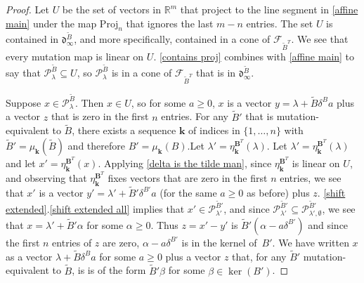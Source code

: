 \documentclass{amsart}
\theoremstyle{definition}
\theoremstyle{remark}
\numberwithin{equation}{section}
\newcommand{\reals}{\mathbb R}
\newcommand{\set}[1]{{\lbrace #1 \rbrace}}
\newcommand{\sett}[1]{{\bigl\lbrace #1 \bigr\rbrace}}
\newcommand{\F}{{\mathcal F}}
\newcommand{\0}{{\mathbf{0}}}
\newcommand{\Proj}{\mathrm{Proj}}
\newcommand{\kk}{\mathbf{k}}
\newcommand{\tB}{{\tilde{B}}}
\newcommand{\BB}{\mathbf{B}}
\renewcommand{\P}{\mathcal{P}}
\renewcommand{\d}{{\mathfrak d}}
\begin{document}
\begin{proof}
%
%
%
%
Let $U$ be the set of vectors in $\reals^m$ that project to the line segment in \cref{affine main} under the map $\Proj_n$ that ignores the last $m-n$ entries.
The set $U$ is contained in $\d_\infty^\tB$, and more specifically, contained in a cone of $\F_{\tB^T}$.
We see that every mutation map is linear on $U$.
\cref{contains proj} combines with \cref{affine main} to say that $\P^\tB_\lambda\subseteq U$, so $\P^\tB_\lambda$ is in a cone of $\F_{\tB^T}$ that is in $\d_\infty^\tB$.

Suppose $x\in\P^\tB_\lambda$.
Then $x\in U$, so for some $a\ge0$, $x$ is a vector $y=\lambda+\tB\delta^Ba$ plus a vector $z$ that is zero in the first $n$ entries.
For any $\tB'$ that is mutation-equivalent to $\tB$, there exists a sequence $\kk$ of indices in $\set{1,\ldots,n}$ with $\tB'=\mu_\kk(\tB)$ and therefore $B'=\mu_\kk(B)$.Let $\lambda'=\eta_\kk^{\BB^T}(\lambda)$.
Let $\lambda'=\eta_\kk^{\BB^T}(\lambda)$ and let $x'=\eta_\kk^{\BB^T}(x)$.
Applying \cref{delta is the tilde man}, since $\eta_\kk^{\BB^T}$ is linear on $U$, and observing that $\eta_\kk^{\BB^T}$ fixes vectors that are zero in the first $n$ entries, we see that $x'$ is a vector $y'=\lambda'+\tB'\delta^{B'}a$ (for the same $a\ge0$ as before) plus $z$.
\cref{shift extended}.\ref{shift extended all} implies that $x'\in\P^{\tB'}_{\lambda'}$, and since $\P^{\tB'}_{\lambda'}\subseteq\P^{\tB'}_{\lambda',\emptyset}$, we see that $x=\lambda'+\tB'\alpha$ for some ${\alpha\ge0}$.
Thus $z=x'-y'$ is $\tB'(\alpha-a\delta^{B'})$ and since the first $n$ entries of $z$ are zero, $\alpha-a\delta^{B'}$ is in the kernel of~$B'$.
We have written $x$ as a vector $\lambda+\tB\delta^Ba$ for some $a\ge0$ plus a vector $z$ that, for any $\tB'$ mutation-equivalent to $\tB$, is is of the form $\tB'\beta$ for some $\beta\in\ker(B')$.
\end{proof}
\end{document}
